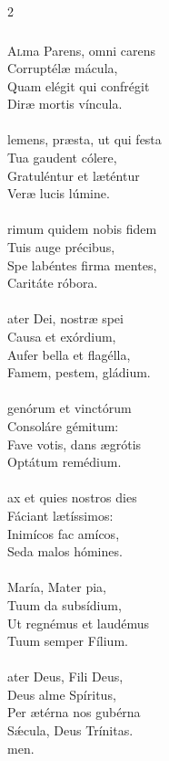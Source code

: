 \documentclass[9pt,twoside]{extarticle}
\begin{document}
\begin{multicols}{2}
\subsubsection*{\center {}}
\lettrine{A}lma Parens, omni carens\\
Corruptélæ mácula,\\
Quam elégit qui confrégit\\
Diræ mortis víncula.\\
\\
lemens, præsta, ut qui festa\\
Tua gaudent cólere,\\
Gratuléntur et læténtur\\
Veræ lucis lúmine.\\
\\
rimum quidem nobis fidem\\
Tuis auge précibus,\\
Spe labéntes firma mentes,\\
Caritáte róbora.\\
\\
ater Dei, nostræ spei\\
Causa et exórdium,\\
Aufer bella et flagélla,\\
Famem, pestem, gládium.\\
\\
genórum et vinctórum\\
Consoláre gémitum:\\
Fave votis, dans ægrótis\\
Optátum remédium.\\
\\
ax et quies nostros dies\\
Fáciant lætíssimos:\\
Inimícos fac amícos,\\
Seda malos hómines.\\
\\
 María, Mater pia,\\
Tuum da subsídium,\\
Ut regnémus et laudémus\\
Tuum semper Fílium.\\
\\
ater Deus, Fili Deus,\\
Deus alme Spíritus,\\
Per ætérna nos gubérna\\
Sǽcula, Deus Trínitas.\\
men.


\end{multicols}
\end{document}
